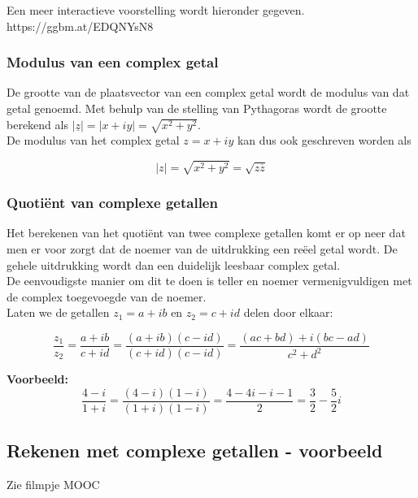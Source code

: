 Een meer interactieve voorstelling wordt hieronder gegeven.\\

https://ggbm.at/EDQNYsN8   \\


\subsubsection{Modulus van een complex getal}

De grootte van de plaatsvector van een complex getal wordt de modulus van dat getal genoemd. Met behulp van de stelling van Pythagoras wordt de grootte berekend als $|\underline{z}|=|x+iy|=\sqrt{x^2 +y^2}$.\\
De modulus van het complex getal $z=x+iy$ kan dus ook geschreven worden als

\begin{framed}
\[ |z|=\sqrt{x^2 +y^2}=\sqrt{z \overline{z}}  \]
\end{framed}

\subsubsection{Quoti\"{e}nt van complexe getallen}

Het berekenen van het quoti\"{e}nt van twee complexe getallen komt er op neer dat men er voor zorgt dat de noemer van de uitdrukking een re\"{e}el getal wordt. De gehele uitdrukking wordt dan een duidelijk leesbaar complex getal.\\
De eenvoudigste manier om dit te doen is teller en noemer vermenigvuldigen met de complex toegevoegde van de noemer.\\
Laten we de getallen $z_{1}=a+ib$ en $z_{2}=c+id$ delen door elkaar:

\begin{framed}
\[ \frac{z_{1}}{z_{2}}=\frac{a+ib}{c+id}=\frac{(a+ib)(c-id)}{(c+id)(c-id)}=\frac{(ac+bd)+i(bc-ad)}{c^2 +d^2}  \]
\end{framed}

{\bf Voorbeeld:} \\

\[ \frac{4-i}{1+i}=\frac{(4-i)(1-i)}{(1+i)(1-i)}=\frac{4-4i-i-1}{2}=\frac{3}{2}-\frac{5}{2}i \]

\vspace{1cm}

\subsection{Rekenen met complexe getallen - voorbeeld}
Zie filmpje MOOC


